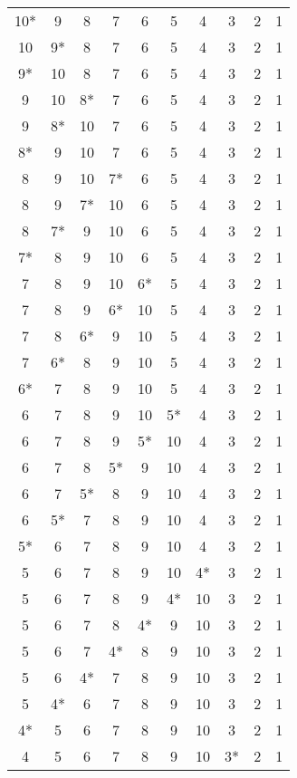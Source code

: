 \begin{center}
    \begin{tabular}{cccccccccc}
    10* & 9 & 8 & 7 & 6 & 5 & 4 & 3& 2 & 1 \\
    10 & 9* & 8 & 7 & 6 & 5 & 4 & 3& 2 & 1 \\
    9* & 10 & 8 & 7 & 6 & 5 & 4 & 3& 2 & 1 \\
    9 & 10 & 8* & 7 & 6 & 5 & 4 & 3& 2 & 1 \\
    9 & 8* & 10 & 7 & 6 & 5 & 4 & 3& 2 & 1 \\
    8* & 9 & 10 & 7 & 6 & 5 & 4 & 3& 2 & 1 \\
    8 & 9 & 10 & 7* & 6 & 5 & 4 & 3& 2 & 1 \\
    8 & 9 & 7* & 10 & 6 & 5 & 4 & 3& 2 & 1 \\
    8 & 7* & 9 & 10 & 6 & 5 & 4 & 3& 2 & 1 \\
    7* & 8 & 9 & 10 & 6 & 5 & 4 & 3& 2 & 1 \\
    7 & 8 & 9 & 10 & 6* & 5 & 4 & 3& 2 & 1 \\
    7 & 8 & 9 & 6* & 10 & 5 & 4 & 3& 2 & 1 \\
    7 & 8 & 6* & 9 & 10 & 5 & 4 & 3& 2 & 1 \\
    7 & 6* & 8 & 9 & 10 & 5 & 4 & 3& 2 & 1 \\
    6* & 7 & 8 & 9 & 10 & 5 & 4 & 3& 2 & 1 \\
    6 & 7 & 8 & 9 & 10 & 5* & 4 & 3& 2 & 1 \\
    6 & 7 & 8 & 9 & 5* & 10 & 4 & 3& 2 & 1 \\
    6 & 7 & 8 & 5* & 9 & 10 & 4 & 3& 2 & 1 \\  
    6 & 7 & 5* & 8 & 9 & 10 & 4 & 3& 2 & 1 \\
    6 & 5* & 7 & 8 & 9 & 10 & 4 & 3& 2 & 1 \\
    5* & 6 & 7 & 8 & 9 & 10 & 4 & 3& 2 & 1 \\
    5 & 6 & 7 & 8 & 9 & 10 & 4* & 3& 2 & 1 \\
    5 & 6 & 7 & 8 & 9 & 4* & 10 & 3& 2 & 1 \\
    5 & 6 & 7 & 8 & 4* & 9 & 10 & 3& 2 & 1 \\
    5 & 6 & 7 & 4* & 8 & 9 & 10 & 3& 2 & 1 \\
    5 & 6 & 4* & 7 & 8 & 9 & 10 & 3& 2 & 1 \\
    5 & 4* & 6 & 7 & 8 & 9 & 10 & 3& 2 & 1 \\
    4* & 5 & 6 & 7 & 8 & 9 & 10 & 3& 2 & 1 \\
    4 & 5 & 6 & 7 & 8 & 9 & 10 & 3* & 2 & 1 \\

\end{tabular}
\end{center}
